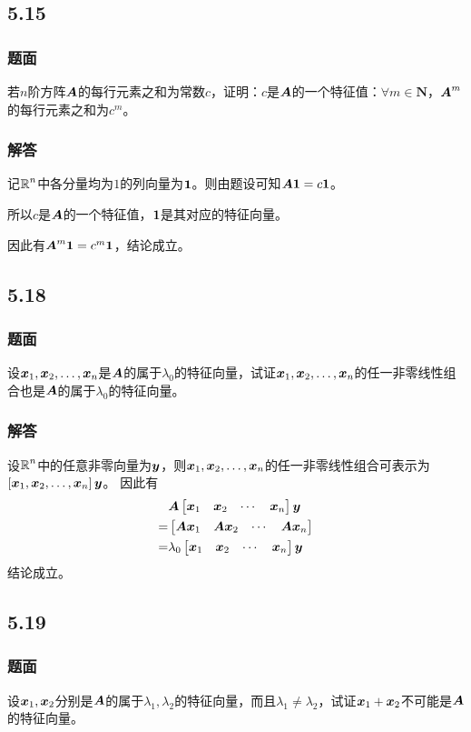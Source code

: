 \documentclass{beamer}
\begin{document}
\subsection*{5.15}
\begin{frame}
    \frametitle{题面}
    若\(n\)阶方阵\(\boldsymbol{A}\)的每行元素之和为常数\(c\)，证明：\(c\)是\(\boldsymbol{A}\)的一个特征值：\(\forall m\in\mathbf{N}\)，\(\boldsymbol{A}^m\)的每行元素之和为\(c^m\)。
\end{frame}

\begin{frame}
    \frametitle{解答}
    记\(\boldsymbol{\mathbb{R}}^n\)中各分量均为\(1\)的列向量为\(\boldsymbol{1}\)。则由题设可知\(\boldsymbol{A}\boldsymbol{1}=c\boldsymbol{1}\)。
    \pause

    所以\(c\)是\(\boldsymbol{A}\)的一个特征值，\(\boldsymbol{1}\)是其对应的特征向量。
    \pause

    因此有\(\boldsymbol{A}^m\boldsymbol{1}=c^m\boldsymbol{1}\)，结论成立。
\end{frame}

\subsection*{5.18}
\begin{frame}
    \frametitle{题面}
    设\({\boldsymbol{x}}_1,{\boldsymbol{x}}_2,\dots,{\boldsymbol{x}}_{n}\)是\(\boldsymbol{A}\)的属于\(\lambda_0\)的特征向量，试证\({\boldsymbol{x}}_1,{\boldsymbol{x}}_2,\dots,{\boldsymbol{x}}_{n}\)的任一非零线性组合也是\(\boldsymbol{A}\)的属于\(\lambda_0\)的特征向量。
\end{frame}

\begin{frame}
    \frametitle{解答}
    设\(\boldsymbol{\mathbb{R}}^n\)中的任意非零向量为\(\boldsymbol{y}\)，则\({\boldsymbol{x}}_1,{\boldsymbol{x}}_2,\dots,{\boldsymbol{x}}_{n}\)的任一非零线性组合可表示为\(\left[ {\boldsymbol{x}}_1,{\boldsymbol{x}}_2,\dots,{\boldsymbol{x}}_{n} \right]\boldsymbol{y}\)。
    \pause
    因此有
    \begin{align*}
          & \boldsymbol{A}\begin{bmatrix}\boldsymbol{x}_1&\boldsymbol{x}_2&\cdots&\boldsymbol{x}_n\end{bmatrix}\boldsymbol{y}      \\
        = & \begin{bmatrix}\boldsymbol{A}\boldsymbol{x}_1&\boldsymbol{A}\boldsymbol{x}_2&\cdots&\boldsymbol{A}\boldsymbol{x}_n\end{bmatrix} \\
        = & \lambda_0\begin{bmatrix}\boldsymbol{x}_1&\boldsymbol{x}_2&\cdots&\boldsymbol{x}_n\end{bmatrix}\boldsymbol{y}
    \end{align*}
    结论成立。
\end{frame}

\subsection*{5.19}
\begin{frame}
    \frametitle{题面}
    设\(\boldsymbol{x}_1,\boldsymbol{x}_2\)分别是\(\boldsymbol{A}\)的属于\(\lambda_1,\lambda_2\)的特征向量，而且\(\lambda_1\neq\lambda_2\)，试证\(\boldsymbol{x}_1+\boldsymbol{x}_2\)不可能是\(\boldsymbol{A}\)的特征向量。
\end{frame}
\end{document}
